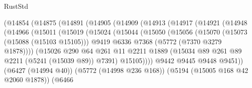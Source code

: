 \begin{lexlean}{RustStd}
\begin{coremodule}
{\begin{coremodule}
{{{{{{{{{{{{{{{{{{{{{{{{{{{{{                        (@14854
                          (@14875
                            (@14891
                              (@14905
                                (@14909
                                  (@14913
                                    (@14917
                                      (@14921
                                        (@14948
                                          (@14966
                                            (@15011
                                              (@15019
                                                (@15024
                                                  (@15044
                                                    (@15050
                                                      (@15056
                                                        (@15070
                                                          (@15073 (@15088 (@15103 @15105)))
                                                          @9419
                                                          @6336
                                                          @7368
                                                          (@5772 (@7370 @3279 @1878))))
                                                      (@15026
                                                        @290
                                                        @64
                                                        @261
                                                        @11
                                                        @2211
                                                        @1889
                                                        (@15034
                                                          @89
                                                          @261
                                                          @89
                                                          @2211
                                                          (@5241 (@15039 @89))
                                                          @7391)
                                                        @15105))))
                                                @9442
                                                @9445
                                                @9448
                                                @9451))
                                            (@6427 (@14994 @40))
                                            (@5772 (@14998 @236 @168))
                                            (@5194 (@15005 @168 @42 @2060 @1878))
                                            (@6466
}}}}}}}}}}}}}}}}}}}}}}}}}}}}}
\end{coremodule}}
\end{coremodule}
\end{lexlean}
